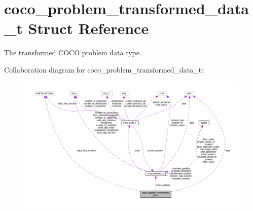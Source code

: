 \hypertarget{structcoco__problem__transformed__data__t}{}\section{coco\+\_\+problem\+\_\+transformed\+\_\+data\+\_\+t Struct Reference}
\label{structcoco__problem__transformed__data__t}


The transformed C\+O\+CO problem data type.  




Collaboration diagram for coco\+\_\+problem\+\_\+transformed\+\_\+data\+\_\+t\+:\nopagebreak
\begin{figure}[H]
\begin{center}
\leavevmode
\includegraphics[width=350pt]{structcoco__problem__transformed__data__t__coll__graph}
\end{center}
\end{figure}
